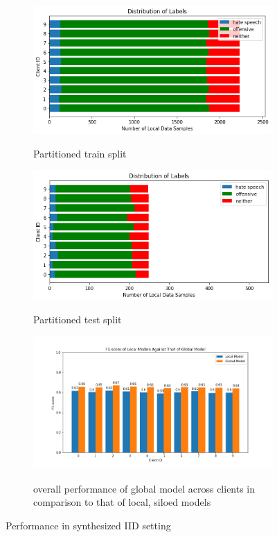 \documentclass[letterpaper]{article} %
\begin{document}
\begin{figure}[hbt!]

\begin{subfigure}{\columnwidth}
{\includegraphics[width=\columnwidth]{iid_distribution_of_labels_7}}
\caption{Partitioned train split}
\end{subfigure}%

\begin{subfigure}{\columnwidth}
{\includegraphics[width=\columnwidth]{iid_test_set_distribution_of_labels_7}}
\caption{Partitioned test split}
\end{subfigure}

\begin{subfigure}{\columnwidth}
{\includegraphics[width=\columnwidth]{iid_seed_7performance_of_models_on_client_data_f1score}}
\caption{overall performance of global model across clients in comparison to that of local, siloed models}
\end{subfigure}

\caption{Performance in synthesized IID setting}
\end{figure}
\end{document}
